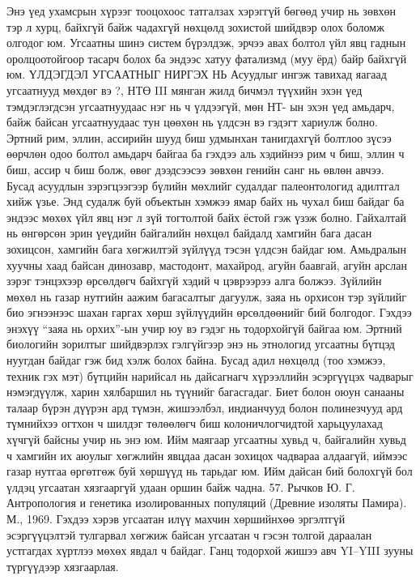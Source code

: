 Энэ үед ухамсрын хүрээг тооцохоос татгалзах хэрэггүй бөгөөд учир нь зөвхөн тэр л хурц, байхгүй байж чадахгүй нөхцөлд зохистой шийдвэр олох боломж олгодог юм. Угсаатны шинэ систем бүрэлдэж, эрчээ авах болтол үйл явц гаднын оролцоотойгоор тасарч болох ба эндээс хатуу фатализмд (муу ёрд) байр байхгүй юм.
ҮЛДЭГДЭЛ УГСААТНЫГ НИРГЭХ НЬ
Асуудлыг ингэж тавихад яагаад угсаатнууд мөхдөг вэ ?, НТӨ III мянган жилд бичмэл түүхийн эхэн үед тэмдэглэгдсэн угсаатнуудаас нэг нь ч үлдээгүй, мөн НТ- ын эхэн үед амьдарч, байж байсан угсаатнуудаас тун цөөхөн нь үлдсэн вэ гэдэгт хариулж болно. Эртний рим, эллин, ассирийн шууд биш удмынхан танигдахгүй болтлоо зүсээ өөрчлөн одоо болтол амьдарч байгаа ба гэхдээ аль хэдийнээ рим ч биш, эллин ч биш, ассир ч биш болж, өвөг дээдсээсээ зөвхөн генийн санг нь өвлөн авчээ. Бусад асуудлын зэрэгцээгээр бүлийн мөхлийг судалдаг палеонтологид адилтгал хийж үзье. Энд судалж буй объектын хэмжээ ямар байх нь чухал биш байдаг ба эндээс мөхөх үйл явц нэг л зүй тогтолтой байх ёстой гэж үзэж болно.
Гайхалтай нь өнгөрсөн эрин үеүдийн байгалийн нөхцөл байдалд хамгийн бага дасан зохицсон, хамгийн бага хөгжилтэй зүйлүүд тэсэн үлдсэн байдаг юм. Амьдралын хуучны хаад байсан динозавр, мастодонт, махайрод, агуйн баавгай, агуйн арслан зэрэг тэнцэхээр өрсөлдөгч байхгүй хэдий ч цэврээрээ алга болжээ. Зүйлийн мөхөл нь газар нутгийн аажим багасалтыг дагуулж, заяа нь орхисон тэр зүйлийг био эгнээнээс шахан гаргах хөрш зүйлүүдийн өрсөлдөөнийг бий болгодог. Гэхдээ энэхүү “заяа нь орхих”-ын учир юу вэ гэдэг нь тодорхойгүй байгаа юм. Эртний биологийн зорилтыг шийдвэрлэх гэлгүйгээр энэ нь этнологид угсаатны бүтцэд нуугдан байдаг гэж бид хэлж болох байна. Бусад адил нөхцөлд (тоо хэмжээ, техник гэх мэт) бүтцийн нарийсал нь дайсагнагч хүрээллийн эсэргүүцэх чадварыг нэмэгдүүлж, харин хялбаршил нь түүнийг багасгадаг. Биет болон оюун санааны талаар бүрэн дүүрэн ард түмэн, жишээлбэл, индианчууд болон полинезчууд ард түмнийхээ огтхон ч шилдэг төлөөлөгч биш колоничлогчидтой харьцуулахад хүчгүй байсны учир нь энэ юм. Ийм маягаар угсаатны хувьд ч, байгалийн хувьд ч хамгийн их аюулыг хөгжлийн явцдаа дасан зохицох чадвараа алдаагүй, иймээс газар нутгаа өргөтгөж буй хөршүүд нь тарьдаг юм. Ийм дайсан бий болохгүй бол үлдэц угсаатан хязгааргүй удаан оршин байж чадна. 57. Рычков Ю. Г. Антропология и генетика изолированных популяций (Древние изоляты Памира). М., 1969.
Гэхдээ хэрэв угсаатан илүү махчин хөршийнхөө эргэлтгүй эсэргүүцэлтэй тулгарвал хөгжиж байсан угсаатан ч гэсэн толгой дараалан устгагдах хүртлээ мөхөх явдал ч байдаг. Ганц тодорхой жишээ авч YI–YIII зууны түргүүдээр хязгаарлая.
